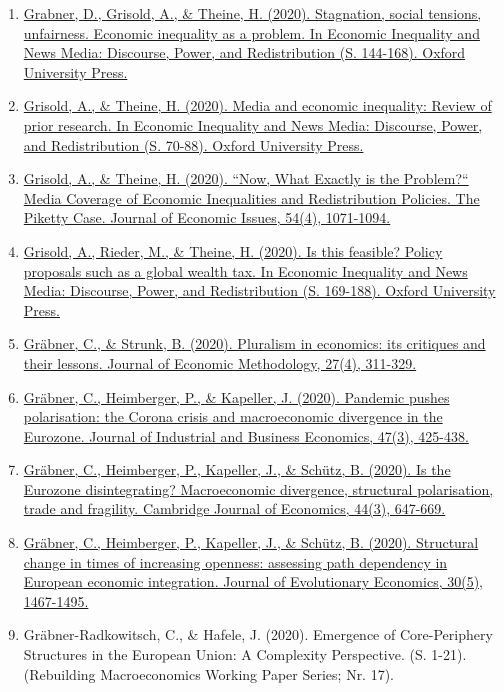 \begin{enumerate}
	 \item \href{https://doi.org/10.1093/oso/9780190053901.003.0008}{Grabner, D., Grisold, A., \& Theine, H. (2020). Stagnation, social tensions, unfairness. Economic inequality as a problem. In Economic Inequality and News Media: Discourse, Power, and Redistribution (S. 144-168). Oxford University Press.}
	 \item \href{https://doi.org/10.1093/oso/9780190053901.003.0004}{Grisold, A., \& Theine, H. (2020). Media and economic inequality: Review of prior research. In Economic Inequality and News Media: Discourse, Power, and Redistribution (S. 70-88). Oxford University Press.}
	 \item \href{https://doi.org/10.1080/00213624.2020.1829905}{Grisold, A., \& Theine, H. (2020). “Now, What Exactly is the Problem?“ Media Coverage of Economic Inequalities and Redistribution Policies. The Piketty Case. Journal of Economic Issues, 54(4), 1071-1094.}
	 \item \href{https://doi.org/10.1093/oso/9780190053901.003.0009}{Grisold, A., Rieder, M., \& Theine, H. (2020). Is this feasible? Policy proposals such as a global wealth tax. In Economic Inequality and News Media: Discourse, Power, and Redistribution (S. 169-188). Oxford University Press.}
	 \item \href{https://doi.org/10.1080/1350178X.2020.1824076}{Gräbner, C., \& Strunk, B. (2020). Pluralism in economics: its critiques and their lessons. Journal of Economic Methodology, 27(4), 311-329.}
	 \item \href{https://doi.org/10.1007/s40812-020-00163-w}{Gräbner, C., Heimberger, P., \& Kapeller, J. (2020). Pandemic pushes polarisation: the Corona crisis and macroeconomic divergence in the Eurozone. Journal of Industrial and Business Economics, 47(3), 425-438.}
	 \item \href{https://doi.org/10.1093/cje/bez059}{Gräbner, C., Heimberger, P., Kapeller, J., \& Schütz, B. (2020). Is the Eurozone disintegrating? Macroeconomic divergence, structural polarisation, trade and fragility. Cambridge Journal of Economics, 44(3), 647-669.}
	 \item \href{https://doi.org/10.1007/s00191-019-00639-6}{Gräbner, C., Heimberger, P., Kapeller, J., \& Schütz, B. (2020). Structural change in times of increasing openness: assessing path dependency in European economic integration. Journal of Evolutionary Economics, 30(5), 1467-1495.}
	 \item Gräbner-Radkowitsch, C., \& Hafele, J. (2020). Emergence of Core-Periphery Structures in the European Union: A Complexity Perspective. (S. 1-21). (Rebuilding Macroeconomics Working Paper Series; Nr. 17).

\end{enumerate}
